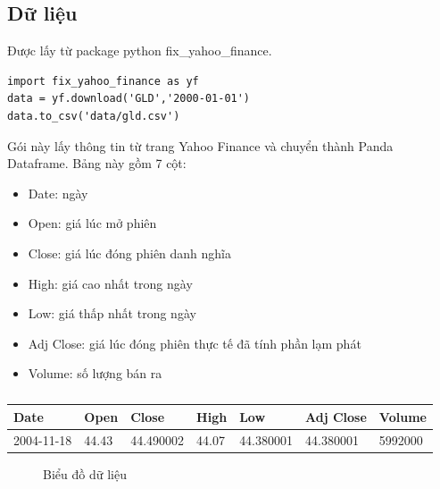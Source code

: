 \subsection{Dữ liệu}
Được lấy từ package python fix\_yahoo\_finance. \\
\begin{verbatim}
import fix_yahoo_finance as yf
data = yf.download('GLD','2000-01-01')
data.to_csv('data/gld.csv')
\end{verbatim}
Gói này lấy thông tin từ trang Yahoo Finance và chuyển thành Panda Dataframe.
Bảng này gồm 7 cột:
\begin{itemize}
    \item Date: ngày
    \item Open: giá lúc mở phiên
    \item Close: giá lúc đóng phiên danh nghĩa
    \item High: giá cao nhất trong ngày
    \item Low: giá thấp nhất trong ngày
    \item Adj Close: giá lúc đóng phiên thực tế đã tính phần lạm phát
    \item Volume: số lượng bán ra
\end{itemize}

\begin{table}[h]
	\begin{tabularx}{\textwidth}{X | X | X | X | X | X | X } 
		Date		& Open  & Close  & High  & Low & Adj Close & Volume  		\\ \hline
		2004-11-18	& 44.43	& 44.490002	& 44.07	 & 44.380001	& 44.380001	& 5992000		\\ %
	\end{tabularx}
	\label{tab:sample-data}
	\caption{}
\end{table}

\begin{figure}[!htb]
    \caption{\label{fig:gld-data} Biểu đồ dữ liệu}
\end{figure}

